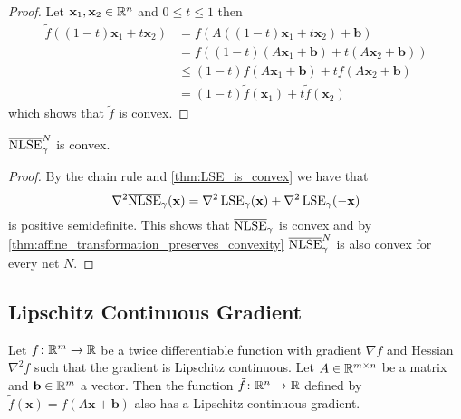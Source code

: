 \begin{proof}
 Let \(\mathbf{x}_1, \mathbf{x}_2 \in \mathbb{R}^n\) and \(0 \leq t \leq 1\) then
 \begin{align*}
  \tilde{f}((1-t)\mathbf{x}_1 + t \mathbf{x}_2) &= f(A((1-t)\mathbf{x}_1 + t \mathbf{x}_2) + \mathbf{b}) \\
                                                &= f((1-t)(A \mathbf{x}_1 + \mathbf{b}) + t(A \mathbf{x}_2 + \mathbf{b})) \\
                                                &\leq (1-t)f(A \mathbf{x}_1 + \mathbf{b}) + t f(A \mathbf{x}_2 + \mathbf{b}) \\
                                                &= (1-t) \tilde{f}(\mathbf{x}_1) + t \tilde{f}(\mathbf{x}_2)
 \end{align*}
 which shows that \(\tilde{f}\) is convex.
\end{proof}


\begin{corollary} \label{thm:NLSE_is_convex}
 \(\overline{\operatorname{NLSE}}_\gamma^N\) is convex.
\end{corollary}

\begin{proof}
 By the chain rule and \cref{thm:LSE_is_convex} we have that
 \[ \nabla^2 \overline{\operatorname{NLSE}}_\gamma (\mathbf{x}) = \nabla^2 \operatorname{LSE}_{\gamma}(\mathbf{x}) + \nabla^2 \operatorname{LSE}_{\gamma}(-\mathbf{x}) \]
 is positive semidefinite.
 This shows that \(\overline{\operatorname{NLSE}}_\gamma\) is convex and by \cref{thm:affine_transformation_preserves_convexity} 
 \(\overline{\operatorname{NLSE}}_\gamma^N\) is also convex for every net \(N\).
\end{proof}



\subsection{Lipschitz Continuous Gradient} \label{sec:NLSE_Lipschitz_continuous_gradient}

\begin{lemma} \label{thm:affine_transformation_preserves_Lipschitz_continuity}
 Let  \(f \colon \mathbb{R}^m \to \mathbb{R}\) be a twice differentiable function with gradient \(\nabla f\) and Hessian \(\nabla^2 f\)
 such that the gradient is Lipschitz continuous.
 Let \(A \in \mathbb{R}^{m \times n}\) be a matrix and \(\mathbf{b} \in \mathbb{R}^m\) a vector.
 Then the function \(\tilde{f} \colon \mathbb{R}^n \to \mathbb{R}\) defined by
 \( \tilde{f}(\mathbf{x}) = f(A\mathbf{x} + \mathbf{b}) \)
 also has a Lipschitz continuous gradient.
\end{lemma}

